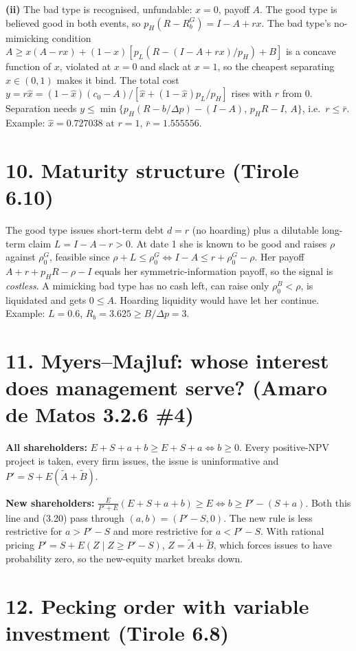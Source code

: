 \documentclass[11pt,a4paper]{article}
\begin{document}
\textbf{(ii)} The bad type is recognised, unfundable: $x=0$, payoff $A$. The good type is believed good in
both events, so $p_H(R-R_b^G)=I-A+rx$. The bad type's no-mimicking condition
$A\ge x(A-rx)+(1-x)[p_L(R-(I-A+rx)/p_H)+B]$ is a concave function of $x$, violated at $x=0$ and slack at
$x=1$, so the cheapest separating $\hat x\in(0,1)$ makes it bind. The total cost
$y=r\hat x=(1-\hat x)(c_0-A)/[\hat x+(1-\hat x)p_L/p_H]$ rises with $r$ from 0. Separation needs
$y\le\min\{p_H(R-b/\Delta p)-(I-A),\,p_HR-I,\,A\}$, i.e.\ $r\le\bar r$. Example: $\hat x=0.727038$ at $r=1$,
$\bar r=1.555556$.

\section*{10. Maturity structure (Tirole 6.10)}

The good type issues short-term debt $d=r$ (no hoarding) plus a dilutable long-term claim
$L=I-A-r>0$. At date 1 she is known to be good and raises $\rho$ against $\rho_0^G$, feasible since
$\rho+L\le\rho_0^G\iff I-A\le r+\rho_0^G-\rho$. Her payoff $A+r+p_HR-\rho-I$ equals her symmetric-information
payoff, so the signal is \emph{costless}. A mimicking bad type has no cash left, can raise only
$\rho_0^B<\rho$, is liquidated and gets $0\le A$. Hoarding liquidity would have let her continue.
Example: $L=0.6$, $R_b=3.625\ge B/\Delta p=3$.

\section*{11. Myers--Majluf: whose interest does management serve? (Amaro de Matos 3.2.6 \#4)}

\textbf{All shareholders:} $E+S+a+b\ge E+S+a\iff b\ge0$. Every positive-NPV project is taken, every firm
issues, the issue is uninformative and $P'=S+E(\widetilde A+\widetilde B)$.

\textbf{New shareholders:} $\frac{E}{P'+E}(E+S+a+b)\ge E\iff b\ge P'-(S+a)$. Both this line and (3.20) pass
through $(a,b)=(P'-S,0)$. The new rule is less restrictive for $a>P'-S$ and more restrictive for
$a<P'-S$. With rational pricing $P'=S+E(Z\mid Z\ge P'-S)$, $Z=\widetilde A+\widetilde B$, which forces issues
to have probability zero, so the new-equity market breaks down.

\section*{12. Pecking order with variable investment (Tirole 6.8)}
\end{document}
